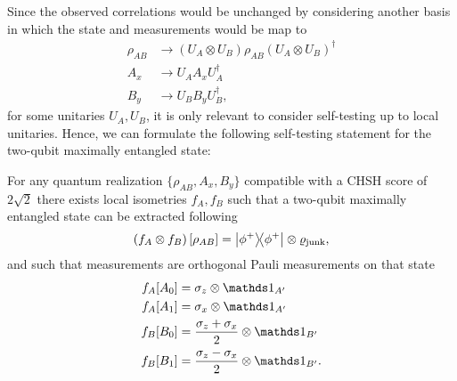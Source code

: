 Since the observed correlations would be unchanged by considering another basis in which the state and measurements would be map to
\begin{equation}
	\begin{split}
		\rho_{AB} &\rightarrow \left(U_A \otimes U_B\right)\rho_{AB}\left(U_A \otimes U_B\right)^\dag \\
		A_x &\rightarrow U_A A_x U_A^\dag \\
		B_y &\rightarrow U_B B_y U_B^\dag ,
	\end{split}	
\end{equation}
for some unitaries $U_A,U_B$, it is only relevant to consider self-testing up to local unitaries.
Hence, we can formulate the following self-testing statement for the two-qubit maximally entangled state:
\begin{theorem}
	For any quantum realization $\{\rho_{AB},A_x,B_y\}$ compatible with a CHSH score of $2\sqrt{2}$ there exists local isometries $f_A,f_B$ such that a two-qubit maximally entangled state can be extracted following
	\begin{displaymath}
		\left(f_A \otimes f_B\right) [\rho_{AB}] = \ketbra{\phi^+} \otimes \varrho_\text{junk},
	\end{displaymath}
	and such that measurements are orthogonal Pauli measurements on that state
	\begin{equation}
		\nonumber
		\begin{split}
			f_A [A_0] &= \sigma_z \otimes \id_{A'} \\
			f_A [A_1] &= \sigma_x \otimes \id_{A'} \\
			f_B [B_0] &= \frac{\sigma_z+\sigma_x}{2} \otimes \id_{B'} \\
			f_B [B_1] &= \frac{\sigma_z-\sigma_x}{2} \otimes \id_{B'}. 
		\end{split}
	\end{equation}
\end{theorem}



